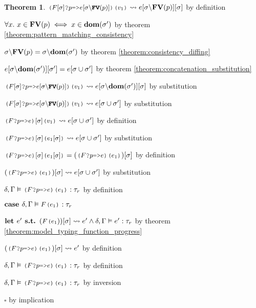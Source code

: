 \documentclass[acmsmall]{acmart}
\theoremstyle{definition}
\newtheorem{theorem}{Theorem}[section]
\begin{document}
\begin{theorem}
      \item \Z\Z $\J{($F[\sigma]$?$p$=>$e[\sigma\backslash\B{FV}(p)]$)($v_1$)} \rightsquigarrow e[\sigma\backslash\B{FV}(p)][\sigma]$ by definition 

      \item \Z\Z $\forall x .\ x \in \textbf{FV}(p) \iff x \in \textbf{dom}(\sigma')$ 
      by theorem \ref{theorem:pattern_matching_consistency}
      \item \Z\Z $\sigma\backslash\textbf{FV}(p) = \sigma\backslash\textbf{dom}(\sigma')$ 
      by theorem \ref{theorem:consistency_diffing}
      \item \Z\Z $e[\sigma\backslash\textbf{dom}(\sigma')][\sigma'] = e[\sigma \cup \sigma']$ 
      by theorem \ref{theorem:concatenation_substitution}

      \item \Z\Z $\J{($F[\sigma]$?$p$=>$e[\sigma\backslash\B{FV}(p)]$)($v_1$)} \rightsquigarrow e[\sigma\backslash\B{dom}(\sigma')][\sigma]$ 
        by substitution
      \item \Z\Z $\J{($F[\sigma]$?$p$=>$e[\sigma\backslash\B{FV}(p)]$)($v_1$)} \rightsquigarrow e[\sigma \cup \sigma']$ 
        by substitution 
      \item \Z\Z $\J{($F$?$p$=>$e$)$[\sigma]$($v_1$)} \rightsquigarrow e[\sigma \cup \sigma']$ by definition 
      \item \Z\Z $\J{($F$?$p$=>$e$)$[\sigma]$($e_1[\sigma]$)} \rightsquigarrow e[\sigma \cup \sigma']$ by substitution  

      \item \Z\Z $\J{($F$?$p$=>$e$)$[\sigma]$($e_1[\sigma]$)} = (\J{($F$?$p$=>$e$)($e_1$)})[\sigma]$ by definition  
      \item \Z\Z $(\J{($F$?$p$=>$e$)($e_1$)})[\sigma] \rightsquigarrow e[\sigma \cup \sigma']$ by substitution  

      \item \Z\Z $\delta, \Gamma \satisfies \J{($F$?$p$=>$e$)($e_1$)} \hastype \tau_r$ by definition

    \item \Z $\B{case } \delta, \Gamma \satisfies \J{$F$($e_1$)} \hastype \tau_r$ 
      \item \Z\Z $\B{let } e' \B{ s.t. } (\J{$F$($e_1$}))[\sigma] \rightsquigarrow e' \land \delta, \Gamma \satisfies e' \hastype \tau_r$ by theorem \ref{theorem:model_typing_function_progress}
      \item \Z\Z $(\J{($F$?$p$=>$e$)($e_1$)})[\sigma] \rightsquigarrow e'$ by definition 
      \item \Z\Z $\delta, \Gamma \satisfies \J{($F$?$p$=>$e$)($e_1$)} \hastype \tau_r$ by definition
    \item \Z $\delta, \Gamma \satisfies \J{($F$?$p$=>$e$)($e_1$)} \hastype \tau_r$ by inversion 
  \item $\square$ by implication
\end{theorem}
\end{document}
